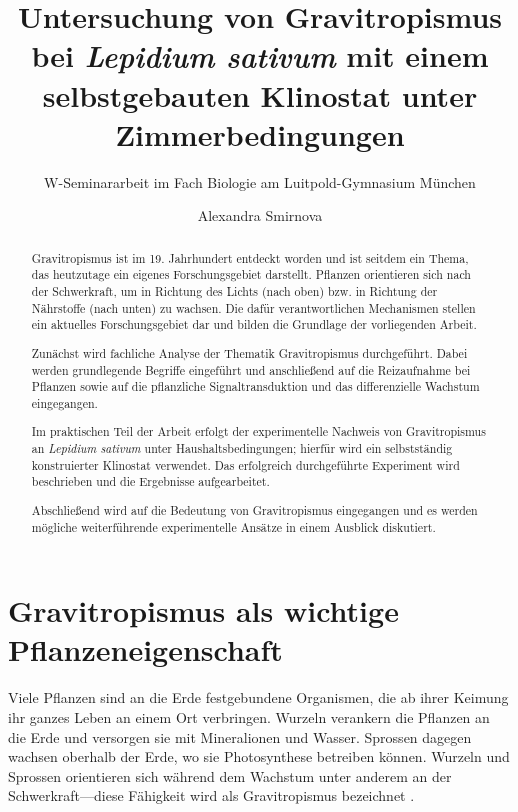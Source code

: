 \documentclass[
11pt, 
ngerman,
listof=totocnumbered,
oneside,
bibliography=totocnumbered,
abstracton
]{scrreprt}
\title{Untersuchung von Gravitropismus bei \emph{Lepidium sativum} mit einem selbstgebauten Klinostat unter Zimmerbedingungen}
\subtitle{W-Seminararbeit im Fach Biologie am Luitpold-Gymnasium München}
\author{Alexandra Smirnova}
\begin{document}
	



\begingroup
\renewcommand*{\chapterpagestyle}{empty}
\pagestyle{empty}
\tableofcontents
\clearpage
\endgroup
	
\renewcommand\abstractname{Abstract}
\begin{abstract}

Gravitropismus ist im 19. Jahrhundert entdeckt worden und ist seitdem ein Thema, das heutzutage ein eigenes Forschungsgebiet darstellt. Pflanzen orientieren sich nach der Schwerkraft, um in Richtung des Lichts ({\glqq nach oben\grqq}) bzw. in Richtung der Nährstoffe ({\glqq nach unten\grqq}) zu wachsen. Die dafür verantwortlichen Mechanismen stellen ein aktuelles Forschungsgebiet dar und bilden die Grundlage der vorliegenden Arbeit. 

Zunächst wird fachliche Analyse der Thematik Gravitropismus durchgeführt. Dabei werden grundlegende Begriffe eingeführt und anschließend auf die Reizaufnahme bei Pflanzen sowie auf die pflanzliche Signaltransduktion und das differenzielle Wachstum eingegangen. 

Im praktischen Teil der Arbeit erfolgt der experimentelle Nachweis von Gravitropismus an \emph{Lepidium sativum} unter Haushaltsbedingungen; hierfür wird ein selbstständig konstruierter Klinostat verwendet. Das erfolgreich durchgeführte Experiment wird beschrieben und die Ergebnisse aufgearbeitet. 

Abschließend wird auf die Bedeutung von Gravitropismus eingegangen und es werden mögliche weiterführende experimentelle Ansätze in einem Ausblick diskutiert. 
	
\end{abstract}


\chapter{Gravitropismus als wichtige Pflanzeneigenschaft}

Viele Pflanzen sind an die Erde festgebundene Organismen, die ab ihrer Keimung ihr ganzes Leben an einem Ort verbringen. Wurzeln verankern die Pflanzen an die Erde und versorgen sie mit Mineralionen und Wasser. Sprossen dagegen wachsen oberhalb der Erde, wo sie Photosynthese betreiben können. Wurzeln und Sprossen orientieren sich während dem Wachstum unter anderem an der Schwerkraft---diese Fähigkeit wird als Gravitropismus bezeichnet \parencite[2]{Masson2002}. 
\end{document}
